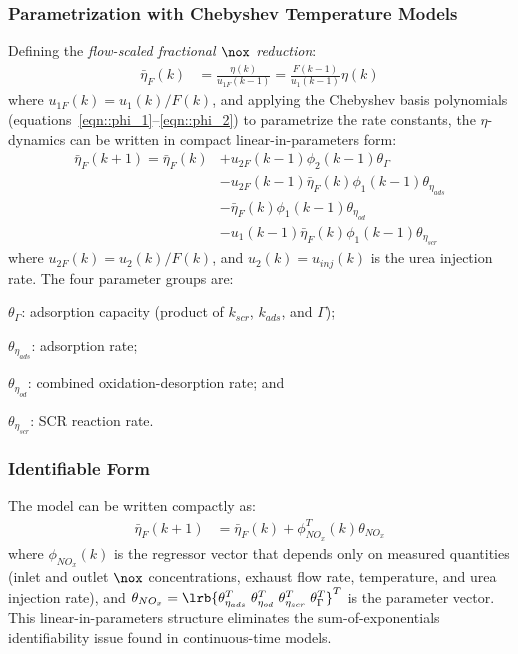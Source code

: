 \subsubsection{Parametrization with Chebyshev Temperature Models}

Defining the \textit{flow-scaled fractional $\nox$ reduction}:
\begin{align}
    \bar \eta_F (k) &= \frac{\eta(k)}{u_{1F}(k-1)} = \frac{F(k-1)}{u_1(k-1)} \eta(k)
    \label{eqn::eta_bar_def}
\end{align}
where $u_{1F}(k) = u_1(k)/F(k)$, and applying the Chebyshev basis polynomials
(equations~\ref{eqn::phi_1}--\ref{eqn::phi_2}) to parametrize the rate constants, the $\eta$-dynamics can be written in
compact linear-in-parameters form:
\begin{align}
    \bar \eta_F (k+1) = \bar \eta_F (k) &+ u_{2F}(k-1)\phi_2(k-1) \theta_\Gamma
        \label{eqn::t2}\\
    &- u_{2F}(k-1) \bar \eta_F (k) \phi_1(k-1) \theta_{\eta_{ads}}
        \label{eqn::t3}\\
    &- \bar \eta_F (k) \phi_1(k-1) \theta_{\eta_{od}}
        \label{eqn::t4}\\
    &- u_1(k-1) \bar \eta_F (k) \phi_1(k-1) \theta_{\eta_{scr}}
        \label{eqn::t5}
\end{align}
where $u_{2F}(k) = u_2(k)/F(k)$, and $u_2(k) = u_{inj}(k)$ is the urea injection rate. The four parameter groups are:
\begin{inparaenum}[(1)]
    \item $\theta_\Gamma$: adsorption capacity (product of $k_{scr}$, $k_{ads}$, and $\Gamma$);
    \item $\theta_{\eta_{ads}}$: adsorption rate;
    \item $\theta_{\eta_{od}}$: combined oxidation-desorption rate; and
    \item $\theta_{\eta_{scr}}$: SCR reaction rate.
\end{inparaenum}

\subsubsection{Identifiable Form}
The model can be written compactly as:
\begin{align}
    \bar \eta_F (k+1) &= \bar \eta_F (k) + \phi_{NO_x}^T(k) \theta_{NO_x}
    \label{eqn::eta_compact}
\end{align}
where $\phi_{NO_x}(k)$ is the regressor vector that depends only on measured quantities (inlet and outlet $\nox$
concentrations, exhaust flow rate, temperature, and urea injection rate), and $\theta_{NO_x} = \lrb{\theta_{\eta_{ads}}^T
\; \theta_{\eta_{od}}^T \; \theta_{\eta_{scr}}^T \; \theta_\Gamma^T}^T$ is the parameter vector. This linear-in-parameters
structure eliminates the sum-of-exponentials identifiability issue found in continuous-time models.
